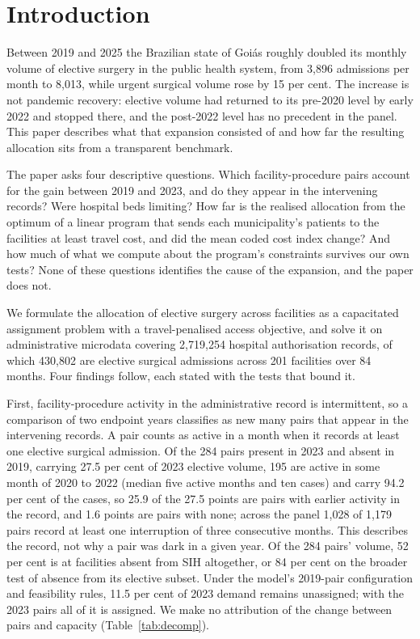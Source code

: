 \section{Introduction}
\label{sec:intro}

Between 2019 and 2025 the Brazilian state of Goi\'as roughly doubled its monthly
volume of elective surgery in the public health system, from 3{,}896 admissions
per month to 8{,}013, while urgent surgical volume rose by 15 per cent. The
increase is not pandemic recovery: elective volume had returned to its
pre-2020 level by early 2022 and stopped there, and the post-2022 level has no
precedent in the panel. This paper describes what that expansion consisted of and how far the resulting allocation sits from a transparent benchmark.

The paper asks four descriptive questions. Which facility-procedure pairs
account for the gain between 2019 and 2023, and do they appear in the intervening records? Were hospital beds limiting? How far is the realised allocation from the optimum of a
linear program that sends each municipality's patients to the facilities at least travel cost, and did the mean coded cost index change? And how much of what we compute
about the program's constraints survives our own tests? None of these questions identifies the cause of the expansion, and the paper does not.

We formulate the allocation of elective surgery across facilities as a
capacitated assignment problem with a travel-penalised access objective, and
solve it on administrative microdata covering 2{,}719{,}254 hospital
authorisation records, of which 430{,}802 are elective surgical admissions
across 201 facilities over 84 months. Four findings follow, each stated with the tests that bound it.

First, facility-procedure activity in the administrative record is intermittent, so a comparison of two endpoint years classifies as new many pairs that appear in the intervening records. A pair counts as active in a month when it records at least one elective surgical admission. Of the 284 pairs present in 2023 and absent in 2019,
carrying 27.5 per cent of 2023 elective volume, 195 are active in some month of 2020 to 2022 (median five active months and ten cases) and carry 94.2 per cent of the cases, so 25.9 of the 27.5 points are
pairs with earlier activity in the record, and 1.6 points are pairs with none; across the panel 1{,}028 of 1{,}179 pairs record at least one interruption of three consecutive months. This describes the record, not why a pair was dark in a given year. Of the 284 pairs' volume, 52 per cent is at facilities absent from SIH altogether, or 84 per cent on the broader test of absence from its elective subset.
Under the model's 2019-pair configuration and feasibility rules, 11.5 per cent of 2023 demand remains unassigned; with the 2023 pairs all of it is assigned. We make no attribution of the change between
pairs and capacity (Table~\ref{tab:decomp}).

